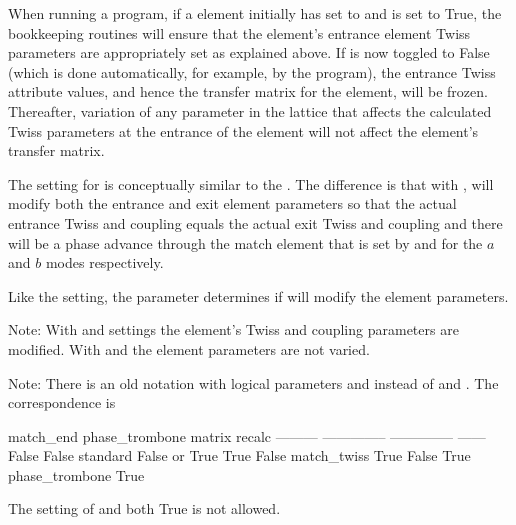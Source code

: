{\begin{description}
When running a program, if a  element initially has  set to  and
 is set to True, the \bmad bookkeeping routines will ensure that the  element's
entrance element Twiss parameters are appropriately set as explained above. If  is now
toggled to False (which is done automatically, for example, by the \tao program), the entrance Twiss attribute
values, and hence the transfer matrix for the  element, will be frozen. Thereafter,
variation of any parameter in the lattice that affects the calculated Twiss parameters at the
entrance of the  element will not affect the  element's transfer matrix.
%
\item[phase_trombone] \Newline
The  setting for  is conceptually similar to the . The
difference is that with , \bmad will modify both the entrance and exit element
parameters so that the actual entrance Twiss and coupling equals the actual exit Twiss and coupling
and there will be a phase advance through the match element that is set by  and
 for the $a$ and $b$ modes respectively.

Like the  setting, the  parameter determines if \bmad will modify the element
parameters.
\end{description}

Note: With  and  settings the element's Twiss and coupling parameters
are modified. With  and  the element parameters are not varied.

\newpage

Note: There is an old notation with logical parameters  and 
instead of  and .  The correspondence is
\begin{example}
  match_end   phase_trombone    matrix           recalc
  ---------   --------------    --------------   ------
  False       False             standard         False or True
  True        False             match_twiss      True
  False       True              phase_trombone   True
\end{example}
The setting of  and  both True is not allowed.

}
